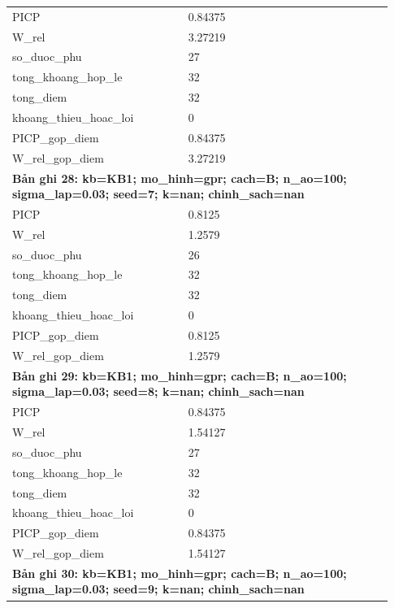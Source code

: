 \begin{longtable}{p{0.43\linewidth}p{0.50\linewidth}}
PICP & 0.84375 \\
W\_\allowbreak rel & 3.27219 \\
so\_\allowbreak duoc\_\allowbreak phu & 27 \\
tong\_\allowbreak khoang\_\allowbreak hop\_\allowbreak le & 32 \\
tong\_\allowbreak diem & 32 \\
khoang\_\allowbreak thieu\_\allowbreak hoac\_\allowbreak loi & 0 \\
PICP\_\allowbreak gop\_\allowbreak diem & 0.84375 \\
W\_\allowbreak rel\_\allowbreak gop\_\allowbreak diem & 3.27219 \\
\midrule
\multicolumn{2}{p{0.95\linewidth}}{\textbf{Bản ghi 28: kb=KB1; mo\_hinh=gpr; cach=B; n\_ao=100; sigma\_lap=0.03; seed=7; k=nan; chinh\_sach=nan}} \\
PICP & 0.8125 \\
W\_\allowbreak rel & 1.2579 \\
so\_\allowbreak duoc\_\allowbreak phu & 26 \\
tong\_\allowbreak khoang\_\allowbreak hop\_\allowbreak le & 32 \\
tong\_\allowbreak diem & 32 \\
khoang\_\allowbreak thieu\_\allowbreak hoac\_\allowbreak loi & 0 \\
PICP\_\allowbreak gop\_\allowbreak diem & 0.8125 \\
W\_\allowbreak rel\_\allowbreak gop\_\allowbreak diem & 1.2579 \\
\midrule
\multicolumn{2}{p{0.95\linewidth}}{\textbf{Bản ghi 29: kb=KB1; mo\_hinh=gpr; cach=B; n\_ao=100; sigma\_lap=0.03; seed=8; k=nan; chinh\_sach=nan}} \\
PICP & 0.84375 \\
W\_\allowbreak rel & 1.54127 \\
so\_\allowbreak duoc\_\allowbreak phu & 27 \\
tong\_\allowbreak khoang\_\allowbreak hop\_\allowbreak le & 32 \\
tong\_\allowbreak diem & 32 \\
khoang\_\allowbreak thieu\_\allowbreak hoac\_\allowbreak loi & 0 \\
PICP\_\allowbreak gop\_\allowbreak diem & 0.84375 \\
W\_\allowbreak rel\_\allowbreak gop\_\allowbreak diem & 1.54127 \\
\midrule
\multicolumn{2}{p{0.95\linewidth}}{\textbf{Bản ghi 30: kb=KB1; mo\_hinh=gpr; cach=B; n\_ao=100; sigma\_lap=0.03; seed=9; k=nan; chinh\_sach=nan}} \\

\end{longtable}
